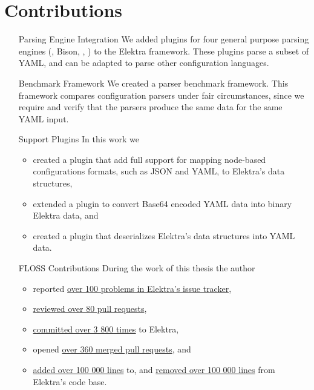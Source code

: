 \section{Contributions}

\begin{itemize}[style=multiline, leftmargin=3cm, font=\bfseries]
  \item[Parsing Engine Integration] We added plugins for four general purpose parsing engines (, Bison, , ) to the Elektra framework. These plugins parse a subset of YAML, and can be adapted to parse other configuration languages.

  \item[Benchmark Framework] We created a parser benchmark framework. This framework compares configuration parsers under fair circumstances, since we require and verify that the parsers produce the same data for the same YAML input.

  \item[Support Plugins] In this work we
  \begin{itemize}
    \item created a plugin that add full support for mapping node-based configurations formats, such as JSON and YAML, to Elektra’s data structures,
    \item extended a plugin to convert Base64 encoded YAML data into binary Elektra data, and
    \item created a plugin that deserializes Elektra’s data structures into YAML data.
  \end{itemize}

  \item[\gls{FLOSS} Contributions] During the work of this thesis the author

  \begin{itemize}
    \item reported \href{https://github.com/ElektraInitiative/libelektra/issues/created_by/sanssecours}{over 100 problems in Elektra’s issue tracker},
    \item \href{https://github.com/ElektraInitiative/libelektra/pulls?q=is%3Apr+is%3Aopen+reviewed-by%3Asanssecours}{reviewed over 80 pull requests},
    \item \href{https://github.com/ElektraInitiative/libelektra/graphs/contributors?from=2012-04-01&to=2019-09-30&type=c}{committed over 3 800 times} to Elektra,
    \item opened \href{https://github.com/ElektraInitiative/libelektra/pulls?q=is%3Apr+is%3Amerged+author%3Asanssecours}{over 360 merged pull requests}, and
    \item \href{https://github.com/ElektraInitiative/libelektra/graphs/contributors?from=2012-04-01&to=2019-09-30&type=a}{added over 100 000 lines} to, and \href{https://github.com/ElektraInitiative/libelektra/graphs/contributors?from=2012-04-01&to=2019-09-30&type=d}{removed over 100 000 lines} from Elektra’s code base.
  \end{itemize}
\end{itemize}

